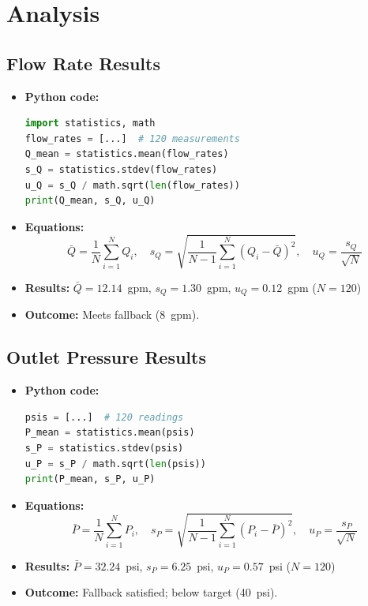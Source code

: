 \documentclass[12pt]{report}
\begin{document}
\newpage
\section{Analysis}

\subsection{Flow Rate Results}
\begin{itemize}[leftmargin=*]
  \item \textbf{Python code:}
    \begin{lstlisting}[language=Python]
import statistics, math
flow_rates = [...]  # 120 measurements
Q_mean = statistics.mean(flow_rates)
s_Q = statistics.stdev(flow_rates)
u_Q = s_Q / math.sqrt(len(flow_rates))
print(Q_mean, s_Q, u_Q)
    \end{lstlisting}
  \item \textbf{Equations:}
    \[
      \bar Q = \frac{1}{N}\sum_{i=1}^N Q_i,\quad
      s_Q = \sqrt{\frac{1}{N-1}\sum_{i=1}^N (Q_i - \bar Q)^2},\quad
      u_Q = \frac{s_Q}{\sqrt{N}}
    \]
  \item \textbf{Results:} $\bar Q = 12.14$ gpm, $s_Q = 1.30$ gpm, $u_Q = 0.12$ gpm ($N=120$)
  \item \textbf{Outcome:} Meets fallback (8 gpm).
\end{itemize}

\subsection{Outlet Pressure Results}
\begin{itemize}[leftmargin=*]
  \item \textbf{Python code:}
    \begin{lstlisting}[language=Python]
psis = [...]  # 120 readings
P_mean = statistics.mean(psis)
s_P = statistics.stdev(psis)
u_P = s_P / math.sqrt(len(psis))
print(P_mean, s_P, u_P)
    \end{lstlisting}
  \item \textbf{Equations:}
    \[
      \bar P = \frac{1}{N}\sum_{i=1}^N P_i,\quad
      s_P = \sqrt{\frac{1}{N-1}\sum_{i=1}^N (P_i - \bar P)^2},\quad
      u_P = \frac{s_P}{\sqrt{N}}
    \]
  \item \textbf{Results:} $\bar P = 32.24$ psi, $s_P = 6.25$ psi, $u_P = 0.57$ psi ($N=120$)
  \item \textbf{Outcome:} Fallback satisfied; below target (40 psi).
\end{itemize}
\end{document}
